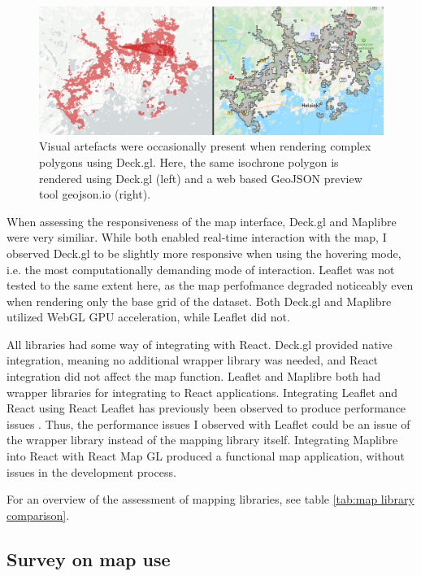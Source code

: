 \begin{figure}[H]
	\centering
	\includegraphics[width=\textwidth]{visual/figures/screenshots/bug.png}
	\caption{
		Visual artefacts were occasionally present
		when rendering complex polygons using Deck.gl.
		Here, the same isochrone polygon is rendered using Deck.gl (left)
		and a web based GeoJSON preview tool geojson.io (right).
	}
	\label{fig:bug}
\end{figure}

When assessing the responsiveness of the map interface,
Deck.gl and Maplibre were very similiar.
While both enabled real-time interaction with the map,
I observed Deck.gl to be slightly more responsive when using the hovering mode,
i.e. the most computationally demanding mode of interaction.
Leaflet was not tested to the same extent here,
as the map perfofmance degraded noticeably
even when rendering only the base grid of the dataset.
Both Deck.gl and Maplibre utilized WebGL GPU acceleration,
while Leaflet did not.

All libraries had some way of integrating with React.
Deck.gl provided native integration,
meaning no additional wrapper library was needed,
and React integration did not affect the map function.
Leaflet and Maplibre both had wrapper libraries for
integrating to React applications.
Integrating Leaflet and React using React Leaflet has previously
been observed to produce performance issues \parencite{gaj2023}.
Thus, the performance issues I observed with Leaflet could be an issue of
the wrapper library instead of the mapping library itself.  %
Integrating Maplibre into React with React Map GL
produced a functional map application,
without issues in the development process.

For an overview of the assessment of mapping libraries,
see table \ref{tab:map library comparison}.




\subsection{Survey on map use}

